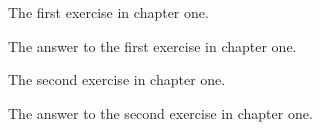 \begin{question}
 The first exercise in chapter one.
\end{question}
\begin{solution}
 The answer to the first exercise in chapter one.
\end{solution}
\begin{question}
 The second exercise in chapter one.
\end{question}
\begin{solution}
 The answer to the second exercise in chapter one.
\end{solution}